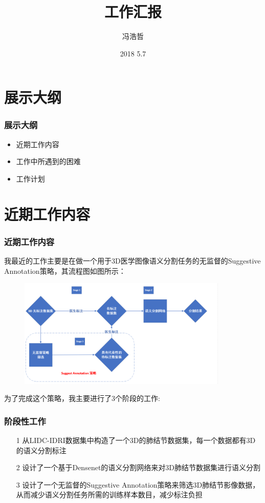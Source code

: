 \documentclass[9pt]{beamer}
\title{工作汇报}
\author
{冯浩哲}
\date{2018 5.7}
\begin{document}
	\frame{\titlepage}

	
	\section*{展示大纲}
\begin{frame}[fragile]
	\frametitle{展示大纲}
	\begin{itemize}  
		
		\item 近期工作内容
		\vspace{0.3cm}
		\item 工作中所遇到的困难
		\vspace{0.3cm}
		\item 工作计划
		
	\end{itemize}
\end{frame}	


\section*{近期工作内容}
\begin{frame}[fragile]
	\frametitle{近期工作内容}
	我最近的工作主要是在做一个用于3D医学图像语义分割任务的无监督的Suggestive Annotation策略，其流程图如图所示：
	\begin{figure}[H]%
		\centering
		\includegraphics[width=10cm]{flowchart.png}%
	\end{figure}
	为了完成这个策略，我主要进行了3个阶段的工作:
\end{frame}

\begin{frame}[fragile]
	\frametitle{阶段性工作}
	\begin{itemize}
		\item[1] 从LIDC-IDRI数据集中构造了一个3D的肺结节数据集，每一个数据都有3D的语义分割标注


		\item[2] 设计了一个基于Densenet的语义分割网络来对3D肺结节数据集进行语义分割
	

		\item[3] 设计了一个无监督的Suggestive Annotation策略来筛选3D肺结节影像数据，从而减少语义分割任务所需的训练样本数目，减少标注负担
	\end{itemize}


\end{frame}
\end{document}
